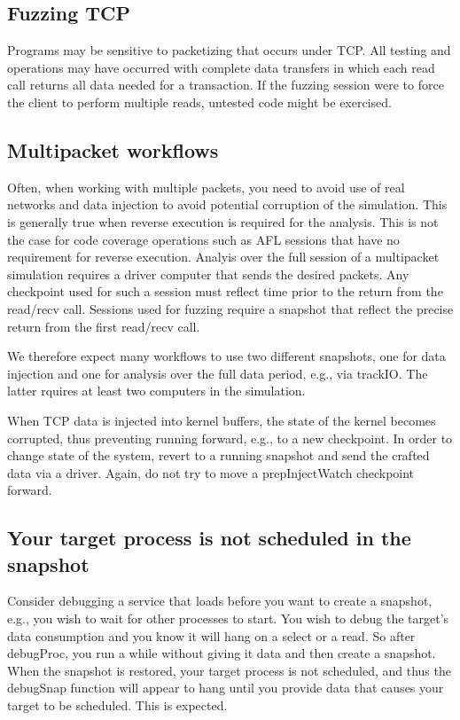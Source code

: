 \documentclass[titlepage]{article}
\begin{document}
\begin{appendices}
\subsection{Fuzzing TCP}
Programs may be sensitive to packetizing that occurs under TCP.  All testing and operations may have occurred with
complete data transfers in which each read call returns all data needed for a transaction.  If the fuzzing session
were to force the client to perform multiple reads, untested code might be exercised.

\subsection{Multipacket workflows}
Often, when working with multiple packets, you need to avoid use of real networks and data injection to avoid potential corruption of the simulation.
This is generally true when reverse execution is required for the analysis.  This is not the case for code coverage operations such as AFL sessions that
have no requirement for reverse execution.  Analyis over the full session of a multipacket simulation requires a driver computer that sends the desired
packets.  Any checkpoint used for such a session must reflect time prior to the return from the read/recv call.  Sessions used for fuzzing 
require a snapshot that reflect the precise return from the first read/recv call.  

We therefore expect many workflows to use two different snapshots, one for data injection and one for analysis over the full data period, e.g., via trackIO.
The latter rquires at least two computers in the simulation.  

When TCP data is injected into kernel buffers, the state of the kernel becomes corrupted, thus preventing running forward, e.g., to a new checkpoint.
In order to change state of the system, revert to a running snapshot and send the crafted data via a driver.  Again, do not try to move a prepInjectWatch
checkpoint forward.

\subsection{Your target process is not scheduled in the snapshot}
Consider debugging a service that loads before you want to create a snapshot, e.g., you wish to wait for other processes to start.
You wish to debug the target's data consumption and you know it will hang on a select or a read. So after debugProc, 
you run a while without giving it data and then create a snapshot.  When the snapshot
is restored, your target process is not scheduled, and thus the debugSnap function will appear to hang until you provide data that causes your
target to be scheduled.  This is expected.


\end{appendices}
\end{document}
